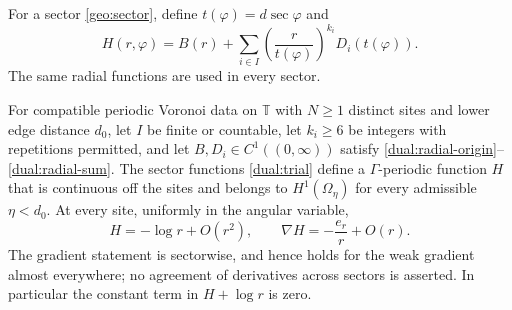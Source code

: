 For a sector \eqref{geo:sector}, define \(t(\varphi)=d\sec\varphi\)
and
\begin{equation}
 H(r,\varphi)=B(r)+
       \sum_{i\in I}\left(\frac r{t(\varphi)}\right)^{k_i}
                                      D_i(t(\varphi)).
 \label{dual:trial}
\end{equation}
The same radial functions are used in every sector.

\begin{lemma}
\label{dual:gluing}
For compatible periodic Voronoi data on \(\mathbb T\) with \(N\geq1\)
distinct sites and lower edge distance \(d_0\), let \(I\) be finite or
countable, let \(k_i\geq6\) be integers with repetitions permitted,
and let \(B,D_i\in C^1((0,\infty))\) satisfy
\eqref{dual:radial-origin}--\eqref{dual:radial-sum}. The sector
functions \eqref{dual:trial} define a \(\Gamma\)-periodic
function \(H\) that is continuous off the sites and belongs to
\(H^1(\Omega_\eta)\) for every admissible \(\eta<d_0\). At every
site, uniformly in the angular variable,
\begin{equation}
 H=-\log r+O(r^2),\qquad
 \nabla H=-\frac{e_r}{r}+O(r).
 \label{dual:singularity}
\end{equation}
The gradient statement is sectorwise, and hence holds for the weak
gradient almost everywhere; no agreement of derivatives across sectors
is asserted.
In particular the constant term in \(H+\log r\) is zero.
\end{lemma}

